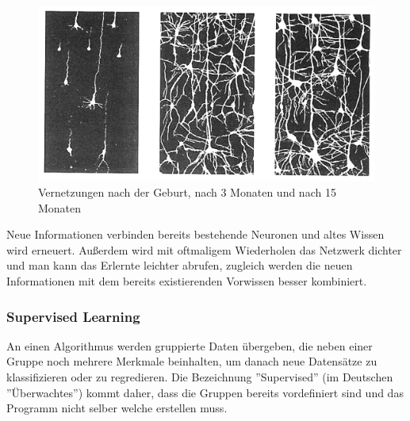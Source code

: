 \begin{figure}[H]
    \centering
    \includegraphics[scale=0.8]{sections/machine-learning/images/neuronale-netze.png}
    \caption{Vernetzungen nach der Geburt, nach 3 Monaten und nach 15 Monaten}
\end{figure}

Neue Informationen verbinden bereits bestehende Neuronen und altes Wissen wird erneuert. Außerdem wird mit oftmaligem Wiederholen das Netzwerk dichter und man kann das Erlernte leichter abrufen, zugleich werden die neuen Informationen mit dem bereits existierenden Vorwissen besser kombiniert. \cite{LANP}

\subsubsection{Supervised Learning}

An einen Algorithmus werden gruppierte Daten übergeben, die neben einer Gruppe noch mehrere Merkmale beinhalten, um danach neue Datensätze zu klassifizieren oder zu regredieren. Die Bezeichnung ''Supervised'' (im Deutschen ''Überwachtes'') kommt daher, dass die Gruppen bereits vordefiniert sind und das Programm nicht selber welche erstellen muss. \cite{SL:online}

\begin{table}[H]
    \centering
    \caption{Beispiel für gruppierte Daten als Tabelle; Merkmale: Farbe, Form, Geschmack; Gruppe: Frucht}
    \label{tbl:fruit-data}
\end{table}

